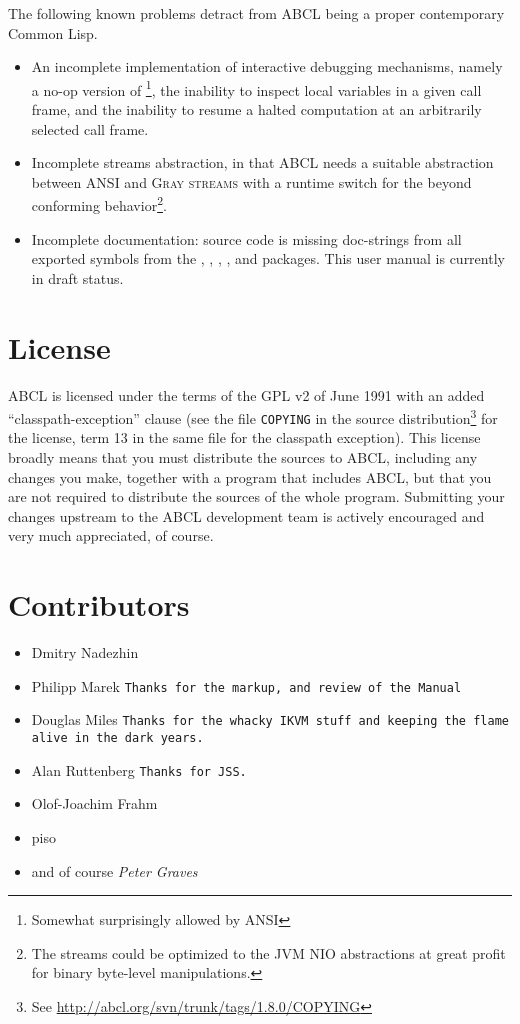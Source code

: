 \documentclass[10pt]{book}
\begin{document}
The following known problems detract from \textsc{ABCL} being a proper
contemporary Common Lisp.
\begin{itemize}
\item An incomplete implementation of interactive debugging
  mechanisms, namely a no-op version of \footnote{Somewhat
    surprisingly allowed by \textsc{ANSI}}, the inability to inspect
  local variables in a given call frame, and the inability to resume a
  halted computation at an arbitrarily selected call frame.
\item Incomplete streams abstraction, in that \textsc{ABCL} needs a
  suitable abstraction between \textsc{ANSI} and \textsc{Gray streams}
  with a runtime switch for the beyond conforming
  behavior\footnote{The streams could be optimized to the
    \textsc{JVM} NIO \cite{nio} abstractions at great profit for
    binary byte-level manipulations.}.
\item Incomplete documentation: source code is missing doc-strings from
  all exported symbols from the , ,
  , , and  packages.  This user
  manual is currently in draft status.
\end{itemize}



\section{License}

\textsc{ABCL} is licensed under the terms of the \textsc{GPL} v2 of
June 1991 with an added ``classpath-exception'' clause (see the file
\texttt{COPYING} in the source distribution\footnote{See
  \url{http://abcl.org/svn/trunk/tags/1.8.0/COPYING}} for the license,
term 13 in the same file for the classpath exception).  This license
broadly means that you must distribute the sources to \textsc{ABCL},
including any changes you make, together with a program that includes
\textsc{ABCL}, but that you are not required to distribute the sources
of the whole program.  Submitting your changes upstream to the \textsc{ABCL}
development team is actively encouraged and very much appreciated, of
course.

\section{Contributors}

\begin{itemize}
\item Dmitry Nadezhin
\item Philipp Marek \texttt{Thanks for the markup, and review of the Manual}
\item Douglas Miles \texttt{Thanks for the whacky IKVM stuff and keeping the flame alive
  in the dark years.}
\item Alan Ruttenberg \texttt{Thanks for JSS.}
\item Olof-Joachim Frahm  
\item piso
\item and of course \emph{Peter Graves}
\end{itemize}
\end{document}
